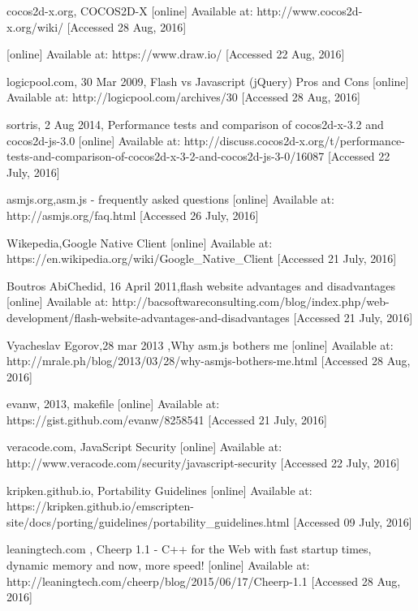 \documentclass[23pt]{article}
\begin{document}
\begin{thebibliography}{9}
cocos2d-x.org, COCOS2D-X  [online] Available at:
{http://www.cocos2d-x.org/wiki/  } [Accessed 28 Aug, 2016]

  [online] Available at:
{ https://www.draw.io/ } [Accessed 22 Aug, 2016]

logicpool.com, 30 Mar 2009,  Flash vs Javascript (jQuery) Pros and Cons [online] Available at: 
{http://logicpool.com/archives/30} [Accessed 28 Aug, 2016]

sortris, 2 Aug 2014, Performance tests and comparison of cocos2d-x-3.2 and cocos2d-js-3.0 [online] Available at:
{http://discuss.cocos2d-x.org/t/performance-tests-and-comparison-of-cocos2d-x-3-2-and-cocos2d-js-3-0/16087} [Accessed 22 July, 2016]

asmjs.org,asm.js - frequently asked questions  [online] Available at:
{http://asmjs.org/faq.html} [Accessed 26 July, 2016]

 Wikepedia,Google Native Client [online] Available at:
{https://en.wikipedia.org/wiki/Google\_Native\_Client} [Accessed 21 July, 2016]

  Boutros AbiChedid, 16 April 2011,flash website advantages and disadvantages [online] Available at:
{http://bacsoftwareconsulting.com/blog/index.php/web-development/flash-website-advantages-and-disadvantages} [Accessed 21 July, 2016]

 Vyacheslav Egorov,28 mar 2013 ,Why asm.js bothers me  [online] Available at:
{http://mrale.ph/blog/2013/03/28/why-asmjs-bothers-me.html} [Accessed 28 Aug, 2016]

evanw, 2013, makefile [online] Available at:
{https://gist.github.com/evanw/8258541} [Accessed 21 July, 2016]

veracode.com, JavaScript Security  [online] Available at:
{http://www.veracode.com/security/javascript-security} [Accessed 22 July, 2016]

kripken.github.io, Portability Guidelines  [online] Available at:
{https://kripken.github.io/emscripten-site/docs/porting/guidelines/portability\_guidelines.html} [Accessed 09 July, 2016]

 leaningtech.com , Cheerp 1.1 - C++ for the Web with fast startup times, dynamic memory and now, more speed! [online] Available at:
{http://leaningtech.com/cheerp/blog/2015/06/17/Cheerp-1.1} [Accessed 28 Aug, 2016]


\end{thebibliography}
\end{document}
